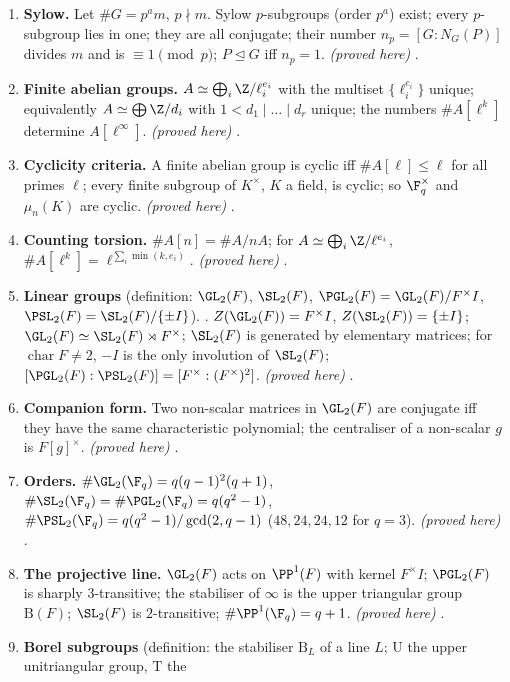 \begin{enumerate}[label=\textbf{\thechapter.\arabic*}]
\item \textbf{Sylow.} Let $\#G=p^am$, $p\nmid m$. Sylow $p$-subgroups (order $p^a$) exist; every $p$-subgroup lies in one; they are all
conjugate; their number $n_p=[G:N_G(P)]$ divides $m$ and is $\equiv1\pmod p$; $P\trianglelefteq G$ iff $n_p=1$. \emph{(proved here)}
.
\item \textbf{Finite abelian groups.} $A\simeq\bigoplus_i\Z/\ell_i^{e_i}$ with the multiset $\{\ell_i^{e_i}\}$ unique; equivalently $A\simeq\bigoplus\Z/d_i$
with $1<d_1\mid\dots\mid d_r$ unique; the numbers $\#A[\ell^k]$ determine $A[\ell^\infty]$. \emph{(proved here)} .
\item \textbf{Cyclicity criteria.} A finite abelian group is cyclic iff $\#A[\ell]\le\ell$ for all primes $\ell$; every finite subgroup of
$K^\times$, $K$ a field, is cyclic; so $\F_q^\times$ and $\mu_n(K)$ are cyclic. \emph{(proved here)} .
\item \textbf{Counting torsion.} $\#A[n]=\#A/nA$; for $A\simeq\bigoplus_i\Z/\ell^{e_i}$, $\#A[\ell^k]=\ell^{\sum_i\min(k,e_i)}$. \emph{(proved here)}
.
\item \textbf{Linear groups} (definition: $\GL_2(F)$, $\SL_2(F)$, $\PGL_2(F)=\GL_2(F)/F^\times I$, $\PSL_2(F)=\SL_2(F)/\{\pm I\}$).
. $Z(\GL_2(F))=F^\times I$, $Z(\SL_2(F))=\{\pm I\}$; $\GL_2(F)\simeq\SL_2(F)\rtimes F^\times$; $\SL_2(F)$ is generated by
elementary matrices; for $\operatorname{char}F\ne2$, $-I$ is the only involution of $\SL_2(F)$; $[\PGL_2(F):\PSL_2(F)]=[F^\times:(F^\times)^2]$.
\emph{(proved here)} .
\item \textbf{Companion form.} Two non-scalar matrices in $\GL_2(F)$ are conjugate iff they have the same characteristic polynomial;
the centraliser of a non-scalar $g$ is $F[g]^\times$. \emph{(proved here)} .
\item \textbf{Orders.} $\#\GL_2(\F_q)=q(q-1)^2(q+1)$, $\#\SL_2(\F_q)=\#\PGL_2(\F_q)=q(q^2-1)$, $\#\PSL_2(\F_q)=q(q^2-1)/\gcd(2,q-1)$
($48,24,24,12$ for $q=3$). \emph{(proved here)} .
\item \textbf{The projective line.} $\GL_2(F)$ acts on $\PP^1(F)$ with kernel $F^\times I$; $\PGL_2(F)$ is sharply $3$-transitive; the stabiliser of
$\infty$ is the upper triangular group $\mathrm B(F)$; $\SL_2(F)$ is $2$-transitive; $\#\PP^1(\F_q)=q+1$. \emph{(proved here)}
.
\item \textbf{Borel subgroups} (definition: the stabiliser $\mathrm B_L$ of a line $L$; $\mathrm U$ the upper unitriangular group, $\mathrm T$ the

\end{enumerate}
